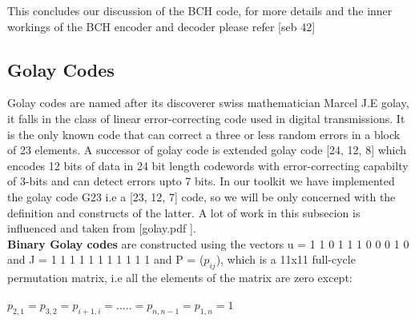 This concludes our discussion of the BCH code, for more details and the inner workings of the BCH encoder and decoder please refer [seb 42]

\subsection{Golay Codes}
Golay codes are named after its discoverer swiss mathematician Marcel J.E golay, it falls in the class of linear error-correcting code used in digital transmissions. It is the only known code that can correct a three or less random errors in a block of 23 elements. A successor of golay code is extended golay code [24, 12, 8] which encodes 12 bits of data in 24 bit length codewords with error-correcting capabilty of 3-bits and can detect errors upto 7 bits. In our toolkit we have implemented
the golay code G23 i.e a [23, 12, 7] code, so we will be only concerned with the definition and constructs of the latter. A lot of work in this subsecion is influenced and taken from [golay.pdf ].\\

\textbf{Binary Golay codes} are constructed using the vectors u = 1 1 0 1 1 1 0 0 0 1 0 and J = 1 1 1 1 1 1 1 1 1 1 1 and P = ($p_{ij}$), which is a 11x11 full-cycle permutation matrix, i.e all the elements of the matrix are zero except:

\tab \tab \tab $p_{2,1} = p_{3,2} = p_{i+1,i} = . . . . . = p_{n,n-1} = p_{1,n} = 1$

